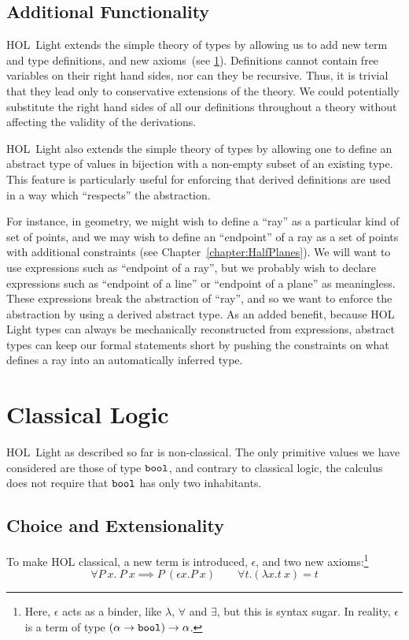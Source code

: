 \subsection{Additional Functionality}
HOL~Light extends the simple theory of types by allowing us to add new term and type definitions, and new axioms~(see \ref{sec:ClassicalAxioms}). Definitions cannot contain free variables on their right hand sides, nor can they be recursive. Thus, it is trivial that they lead only to conservative extensions of the theory. We could potentially substitute the right hand sides of all our definitions throughout a theory without affecting the validity of the derivations.

HOL~Light also extends the simple theory of types by allowing one to define an abstract type of values in bijection with a non-empty subset of an existing type. This feature is particularly useful for enforcing that derived definitions are used in a way which ``respects'' the abstraction.

For instance, in geometry, we might wish to define a ``ray'' as a particular kind of set of points, and we may wish to define an ``endpoint'' of a ray as a set of points with additional constraints (see Chapter~\ref{chapter:HalfPlanes}). We will want to use expressions such as ``endpoint of a ray'', but we probably wish to declare expressions such as ``endpoint of a line'' or ``endpoint of a plane'' as meaningless. These expressions break the abstraction of ``ray'', and so we want to enforce the abstraction by using a derived abstract type. As an added benefit, because HOL Light types can always be mechanically reconstructed from expressions, abstract types can keep our formal statements short by pushing the constraints on what defines a ray into an automatically inferred type.

\section{Classical Logic}\label{sec:ClassicalAxioms}
HOL~Light as described so far is non-classical. The only primitive values we have considered are those of type $\texttt{bool}$, and contrary to classical logic, the calculus does not require that $\texttt{bool}$ has only two inhabitants.

\subsection{Choice and Extensionality}
To make HOL classical, a new term is introduced, $\epsilon$, and two new axioms:\footnote{Here, $\epsilon$ acts as a binder, like $\lambda$, $\forall$ and $\exists$, but this is syntax sugar. In reality, $\epsilon$ is a term of type $(\alpha \rightarrow \texttt{bool}) \rightarrow \alpha$.}
\begin{displaymath}
\forall P\ x.\ P\ x \implies P\ (\epsilon x. P\ x) \qquad \forall t. (\lambda x. t\ x) = t
\end{displaymath}

